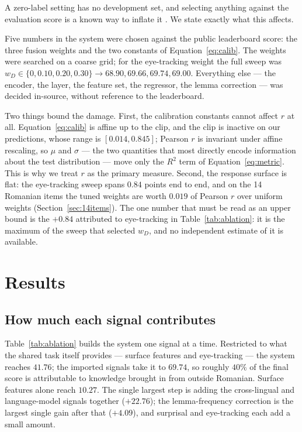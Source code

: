 A zero-label setting has no development set, and selecting anything
against the evaluation score is a known way to inflate it
\citep{gorman-bedrick-2019-need}. We state exactly what this affects.

Five numbers in the system were chosen against the public leaderboard
score: the three fusion weights and the two constants of
Equation~\ref{eq:calib}. The weights were searched on a coarse grid;
for the eye-tracking weight the full sweep was
$w_D \in \{0, 0.10, 0.20, 0.30\} \rightarrow 68.90, 69.66, 69.74,
69.00$. Everything else --- the encoder, the layer, the feature set,
the regressor, the lemma correction --- was decided in-source, without
reference to the leaderboard.

Two things bound the damage. First, the calibration constants cannot
affect $r$ at all. Equation~\ref{eq:calib} is affine up to the clip,
and the clip is inactive on our predictions, whose range is
$[0.014, 0.845]$; Pearson $r$ is invariant under affine rescaling, so
$\mu$ and $\sigma$ --- the two quantities that most directly encode
information about the test distribution --- move only the $R^2$ term of
Equation~\ref{eq:metric}. This is why we treat $r$ as the primary
measure. Second, the response surface is flat: the eye-tracking sweep
spans $0.84$ points end to end, and on the 14 Romanian items the tuned
weights are worth $0.019$ of Pearson $r$ over uniform weights
(Section~\ref{sec:14items}). The one number that must be read as an
upper bound is the $+0.84$ attributed to eye-tracking in
Table~\ref{tab:ablation}: it is the maximum of the sweep that selected
$w_D$, and no independent estimate of it is available.

\section{Results}
\label{sec:results}

\subsection{How much each signal contributes}

Table~\ref{tab:ablation} builds the system one signal at a time.
Restricted to what the shared task itself provides --- surface features
and eye-tracking --- the system reaches $41.76$; the imported signals
take it to $69.74$, so roughly $40\%$ of the final score is
attributable to knowledge brought in from outside Romanian. Surface
features alone reach $10.27$. The single largest step is adding the
cross-lingual and language-model signals together ($+22.76$); the
lemma-frequency correction is the largest single gain after that
($+4.09$), and surprisal and eye-tracking each add a small amount.

